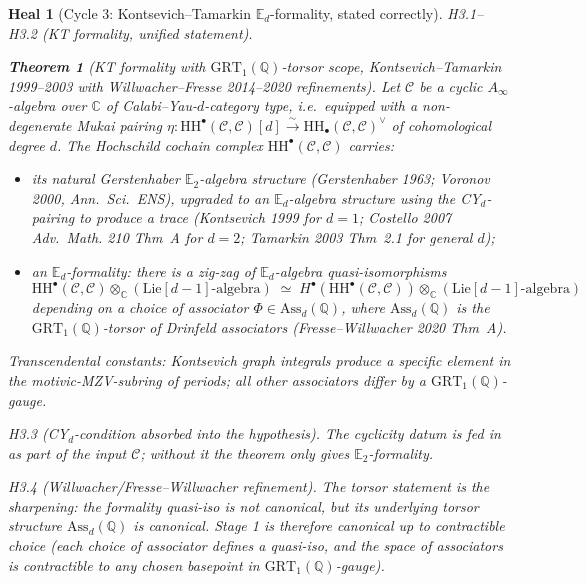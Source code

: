\documentclass[11pt]{article}
\newtheorem{theorem}{Theorem}
\newtheorem*{heal}{Heal}
\theoremstyle{definition}
\providecommand{\CC}{\mathbb{C}}
\providecommand{\QQ}{\mathbb{Q}}
\providecommand{\HH}{\mathrm{HH}}
\providecommand{\cC}{\mathcal{C}}
\providecommand{\Lie}{\mathrm{Lie}}
\begin{document}
\begin{heal}[Cycle 3: Kontsevich--Tamarkin $\mathbb{E}_d$-formality, stated correctly]

\emph{H3.1--H3.2 (KT formality, unified statement).}

\begin{theorem}[KT formality with $\mathrm{GRT}_1(\QQ)$-torsor scope,
Kontsevich--Tamarkin 1999--2003 with Willwacher--Fresse 2014--2020
refinements]
\label{thm:kt-formality}
Let $\cC$ be a cyclic $A_\infty$-algebra over $\CC$ of
Calabi--Yau-$d$-category type, i.e.\ equipped with a non-degenerate
Mukai pairing
$\eta\colon \HH^\bullet(\cC,\cC)[d] \xrightarrow{\sim} \HH_\bullet(\cC,\cC)^\vee$
of cohomological degree $d$. The Hochschild cochain complex
$\HH^\bullet(\cC,\cC)$ carries:
\begin{itemize}[leftmargin=2em]
  \item its natural Gerstenhaber $\mathbb{E}_2$-algebra structure
        (Gerstenhaber 1963; Voronov 2000, \emph{Ann.~Sci.~ENS}),
        upgraded to an $\mathbb{E}_d$-algebra structure using the
        CY$_d$-pairing to produce a trace (Kontsevich 1999 for
        $d = 1$; Costello 2007 \emph{Adv.~Math.} 210 Thm~A for $d = 2$;
        Tamarkin 2003 Thm~2.1 for general $d$);
  \item an $\mathbb{E}_d$-formality: there is a zig-zag
        of $\mathbb{E}_d$-algebra quasi-isomorphisms
        \[
          \HH^\bullet(\cC,\cC)\otimes_\CC (\Lie[d-1]\text{-algebra})
          \;\simeq\; H^\bullet(\HH^\bullet(\cC,\cC)) \otimes_\CC (\Lie[d-1]\text{-algebra})
        \]
        depending on a choice of associator $\Phi \in \mathrm{Ass}_d(\QQ)$,
        where $\mathrm{Ass}_d(\QQ)$ is the $\mathrm{GRT}_1(\QQ)$-torsor of
        Drinfeld associators (Fresse--Willwacher 2020 Thm~A).
\end{itemize}
Transcendental constants: Kontsevich graph integrals produce a specific
element in the motivic-MZV-subring of periods; all other associators
differ by a $\mathrm{GRT}_1(\QQ)$-gauge.
\end{theorem}

\emph{H3.3 (CY$_d$-condition absorbed into the hypothesis).} The
cyclicity datum is fed in as part of the input $\cC$; without it the
theorem only gives $\mathbb{E}_2$-formality.

\emph{H3.4 (Willwacher/Fresse--Willwacher refinement).} The torsor
statement is the sharpening: the formality quasi-iso is not
canonical, but its underlying torsor structure $\mathrm{Ass}_d(\QQ)$
is canonical. Stage 1 is therefore canonical up to contractible
choice (each choice of associator defines a quasi-iso, and the space
of associators is contractible to any chosen basepoint in
$\mathrm{GRT}_1(\QQ)$-gauge).


\end{heal}
\end{document}
